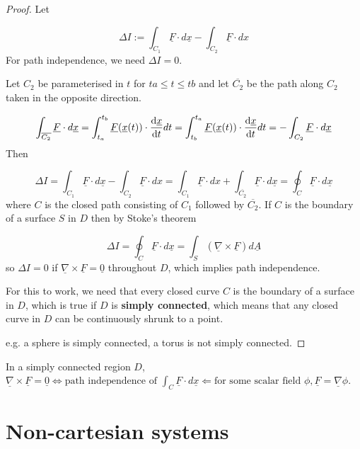 \begin{proof}
	Let

	\[ \Delta I := \int_{C_1} \underline{F} \cdot d\underline{x} - \int_{C_2} \underline{F} \cdot dx \]
	For path independence, we need $\Delta I = 0$.

	Let $C_2$ be parameterised in $t$ for $ta \le t \le tb$ and let $\overline{C_2}$ be the path along $C_2$ taken in the opposite direction.

	\[ \int_{\overline{C_2}} \underline{F} \cdot d\underline{x} = \int_{t_a}^{t_b} \underline{F}(\underline{x}(t)) \cdot \diff{\underline{x}}{t} dt = \int_{t_b}^{t_a} \underline{F}(\underline{x}(t)) \cdot \diff{\underline{x}}{t} dt = -\int_{C_2} \underline{F} \cdot d\underline{x} \]
	Then
	
	\[ \Delta I = \int_{C_1} \underline{F} \cdot d\underline{x} - \int_{C_2} \underline{F} \cdot dx = \int_{C_1} \underline{F} \cdot dx + \int_{\overline{C_2}} \underline{F} \cdot d\underline{x} = \oint_C \underline{F} \cdot d\underline{x} \]
	where $C$ is the closed path consisting of $C_1$ followed by $\overline{C_2}$. If $C$ is the boundary of a surface $S$ in $D$ then by Stoke's theorem

	\[ \Delta I = \oint_C \underline{F} \cdot d\underline{x} = \int_S (\underline{\nabla} \times \underline{F}) d\underline{A} \]
	so $\Delta I = 0$ if $\underline{\nabla} \times \underline{F} = \underline{0}$ throughout $D$, which implies path independence.

	For this to work, we need that every closed curve $C$ is the boundary of a surface in $D$, which is true if $D$ is \textbf{simply connected}, which means that any closed curve in $D$ can be continuously shrunk to a point.

	e.g. a sphere is simply connected, a torus is not simply connected.
\end{proof}

\begin{corollary}
	In a simply connected region $D$, $\underline{\nabla} \times \underline{F} = \underline{0} \Leftrightarrow \text{path independence of } \int_C \underline{F} \cdot d\underline{x} \Leftarrow \text{for some scalar field } \phi, \underline{F} = \underline{\nabla} \phi$.
\end{corollary}

\section{Non-cartesian systems}

